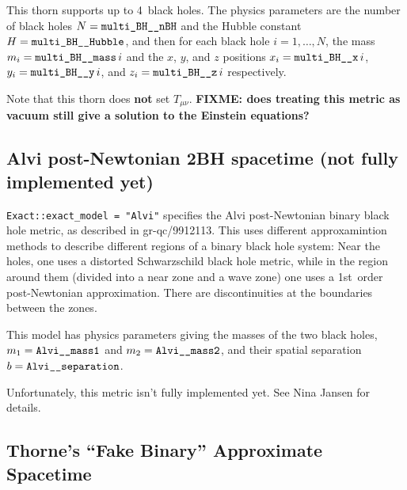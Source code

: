 This thorn supports up to 4~black holes.  The physics parameters are
the number of black holes $N = \verb|multi_BH__nBH|$ and the Hubble constant
$H = \verb|multi_BH__Hubble|$, and then for each black hole $i = 1, \dots, N$,
the mass $m_i = \verb|multi_BH__mass|\,i$ and the $x$, $y$, and $z$ positions
$x_i = \verb|multi_BH__x|\,i$, $y_i = \verb|multi_BH__y|\,i$,
and $z_i = \verb|multi_BH__z|\,i$ respectively.

Note that this thorn does {\bf not} set $T_{\mu\nu}$.
{\bf FIXME: does treating this metric as vacuum still give a solution
to the Einstein equations?}


\subsection{Alvi post-Newtonian 2BH spacetime (not fully implemented yet)}

\verb|Exact::exact_model = "Alvi"| specifies the Alvi post-Newtonian
binary black hole metric, as described in gr-qc/9912113.  This
uses different approxamintion methods to describe different regions
of a binary black hole system: Near the holes, one uses a distorted
Schwarzschild black hole metric, while in the region around them
(divided into a near zone and a wave zone) one uses a 1st~order
post-Newtonian approximation. There are discontinuities at the
boundaries between the zones. 

This model has physics parameters giving the masses of the two black
holes, $m_1 = \verb|Alvi__mass1|$ and $m_2 = \verb|Alvi__mass2|$, and
their spatial separation $b = \verb|Alvi__separation|$.

Unfortunately, this metric isn't fully implemented yet.
See Nina Jansen for details.


\subsection{Thorne's ``Fake Binary'' Approximate Spacetime}

